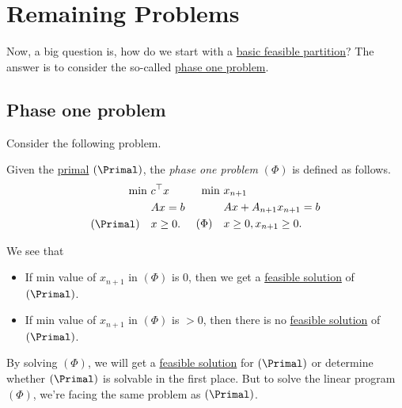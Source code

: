 \section{Remaining Problems}
Now, a big question is, how do we start with a \hyperref[def:basic-partition]{basic feasible partition}? The answer is to consider the so-called \hyperref[def:phase-one-problem]{phase one problem}.

\subsection{Phase one problem}
Consider the following problem.

\begin{definition}\label{def:phase-one-problem}
	Given the \hyperref[def:primal]{primal} \((\Primal)\), the \emph{phase one problem} \((\Phi)\) is defined as follows.
	\[
		\begin{aligned}
			\min~          & c^{\top}x   \\
			               & Ax = b      \\
			(\Primal)\quad & x\geq  0 	.
		\end{aligned}\quad \begin{aligned}
			\min~       & x_{n+1}                   \\
			            & Ax + A_{n+1}x_{n+1} = b   \\
			(\Phi)\quad & x\geq 0, x_{n+1} \geq  0.
		\end{aligned}
	\]
\end{definition}

\begin{remark}
	We see that
	\begin{itemize}
		\item If min value of \(x_{n+1}\) in \((\Phi)\) is 0, then we get a \hyperref[def:feasible-solution]{feasible solution} of \((\Primal)\).
		\item If min value of \(x_{n+1}\) in \((\Phi)\) is \(>0\), then there is no \hyperref[def:feasible-solution]{feasible solution} of \((\Primal)\).
	\end{itemize}
\end{remark}

By solving \((\Phi)\), we will get a \hyperref[def:feasible-solution]{feasible solution} for \((\Primal)\) or determine whether \((\Primal)\) is solvable in the first place. But to solve the linear program \((\Phi)\), we're facing the same problem as \((\Primal)\).

